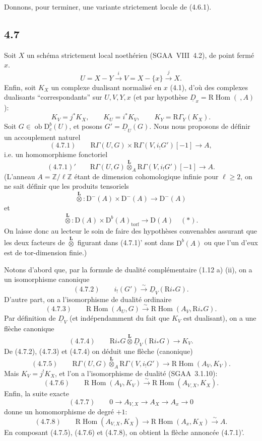 \documentclass[11pt]{article}
\DeclareMathOperator{\Hom}{Hom}
\newcommand{\R}{\mathrm{R}}
\newcommand{\D}{\mathrm{D}}
\newcommand{\Z}{\mathbb{Z}}
\newcommand{\ob}{\operatorname{ob}}
\providecommand{\Hom}{\operatorname{Hom}}
\providecommand{\ob}{\operatorname{ob}}
\providecommand{\R}{\mathrm R}
\providecommand{\Z}{\mathbb Z}
\providecommand{\Hom}{\operatorname{Hom}}
\begin{document}
Donnons, pour terminer, une variante strictement locale de (4.6.1).

\subsection*{4.7}
Soit $X$ un schéma strictement local noethérien (SGAA~VIII~4.2), de point fermé $x$.%
\[
U=X-Y\xrightarrow{i}V=X-\{x\}\xrightarrow{j}X.
\]
Enfin, soit $K_X$ un complexe dualisant normalisé en $x$ (4.1), d'où des complexes dualisants ``correspondants'' sur $U,V,Y,x$ (et par hypothèse $\underline{D}_x=\R\Hom(\ ,A)$):
\[
K_V=j^*K_X,
\qquad K_U=i^*K_V,
\qquad K_Y=\R\Gamma_Y(K_X).
\]
Soit $G\in\ob\D_c^b(U)$, et posons $G'=\underline{D}_U(G)$. Nous nous proposons de définir un accouplement naturel
\[
(4.7.1)\qquad \R\Gamma(U,G)\times \R\Gamma(V,i_!G')[-1]\longrightarrow A,
\]
i.e. un homomorphisme fonctoriel
\[
(4.7.1)'\qquad \R\Gamma(U,G)\overset{\mathbf L}{\otimes}_A\R\Gamma(V,i_!G')[-1]\longrightarrow A.
\]
(L'anneau $A=\Z/\ell\Z$ étant de dimension cohomologique infinie pour $\ell\geqslant2$, on ne sait définir que les produits tensoriels
\[
\overset{\mathbf L}{\otimes}:\D^-(A)\times\D^-(A)\longrightarrow\D^-(A)
\]
et
\[
\overset{\mathbf L}{\otimes}:\D(A)\times\D^b(A)_{\mathrm{torf}}\longrightarrow\D(A)\quad(*).
\]
On laisse donc au lecteur le soin de faire des hypothèses convenables assurant que les deux facteurs de $\overset{\mathbf L}{\otimes}$ figurant dans (4.7.1)' sont dans $\D^b(A)$ ou que l'un d'eux est de tor-dimension finie.)

Notons d'abord que, par la formule de dualité complémentaire (1.12 a) (ii), on a un isomorphisme canonique
\[
(4.7.2)\qquad i_!(G')\xrightarrow{\sim}\underline{D}_V(\R i_*G).
\]
D'autre part, on a l'isomorphisme de dualité ordinaire
\[
(4.7.3)\qquad \R\Hom(A_U,G)\xrightarrow{\sim}\R\Hom(A_V,\R i_*G).
\]
Par définition de $\underline{D}_V$ (et indépendamment du fait que $K_V$ est dualisant), on a une flèche canonique
\[
(4.7.4)\qquad \R i_*G\overset{\mathbf L}{\otimes}\underline{D}_V(\R i_*G)\longrightarrow K_V.
\]
De (4.7.2), (4.7.3) et (4.7.4) on déduit une flèche (canonique)
\[
(4.7.5)\qquad \R\Gamma(U,G)\overset{\mathbf L}{\otimes}_A\R\Gamma(V,i_!G')\longrightarrow \R\Hom(A_V,K_V).
\]
Mais $K_V=j^{!}K_X$, et l'on a l'isomorphisme de dualité (SGAA~3.1.10):
\[
(4.7.6)\qquad \R\Hom(A_V,K_V)\xrightarrow{\sim}\R\Hom(A_{V,X},K_X).
\]
Enfin, la suite exacte
\[
(4.7.7)\qquad 0\longrightarrow A_{V,X}\longrightarrow A_X\longrightarrow A_x\longrightarrow 0
\]
donne un homomorphisme de degré $+1$:
\[
(4.7.8)\qquad \R\Hom(A_{V,X},K_X)\longrightarrow \R\Hom(A_x,K_X)\xrightarrow{\sim}A.
\]
En composant (4.7.5), (4.7.6) et (4.7.8), on obtient la flèche annoncée (4.7.1)'.
\end{document}
